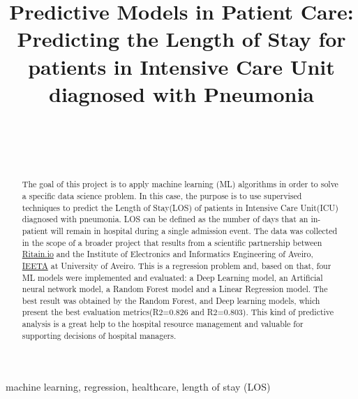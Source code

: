 \documentclass[journal]{IEEEtran} %
\begin{document}
\title{Predictive Models in Patient Care: Predicting the Length of Stay for patients in Intensive Care Unit diagnosed with Pneumonia\\}

\author{%
    \\%
    \\%
    \\%
}

\maketitle

\begin{abstract}
The goal of this project is to apply machine learning (ML) algorithms in order to solve a specific data science problem. In this case, the purpose is to use supervised techniques to predict the Length of Stay(LOS) of patients in Intensive Care Unit(ICU) diagnosed with pneumonia. LOS can be defined as the number of days that an in-patient will remain in hospital during a single admission event. The data was collected in the scope
of a broader project that results from a scientific partnership
between \hyperlink{https://ritain.io}{Ritain.io} and the Institute of Electronics and Informatics Engineering of Aveiro, \hyperlink{http://www.ieeta.pt/}{IEETA} at University of Aveiro. This is a regression problem and, based on that, four ML models were implemented and evaluated: a Deep Learning model, an Artificial neural network model, a Random Forest model and a Linear Regression model. The best result was obtained by the Random Forest, and Deep learning models, which present the best evaluation metrics(R2=0.826 and R2=0.803). This kind of predictive analysis is a great help to the hospital resource management and valuable for supporting decisions of hospital managers.
\end{abstract}

\begin{IEEEkeywords}
    machine learning, regression, healthcare, length of stay (LOS)
\end{IEEEkeywords}
\end{document}
